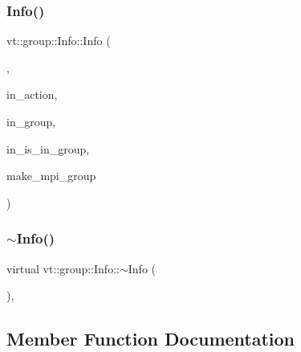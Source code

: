 \mbox{\label{structvt_1_1group_1_1_info_a87a6ef1f2feb855de0ba58d87471ecb8}} 
\subsubsection{\texorpdfstring{Info()}{Info()}\hspace{0.1cm}{\footnotesize\ttfamily [5/5]}}
{\footnotesize\ttfamily vt\+::group\+::\+Info\+::\+Info (\begin{DoxyParamCaption}\item[{Info\+Collective\+Cons\+Type}]{,  }\item[{\hyperlink{namespacevt_ae0a5a7b18cc99d7b732cb4d44f46b0f3}{Action\+Type}}]{in\+\_\+action,  }\item[{\hyperlink{namespacevt_a27b5e4411c9b6140c49100e050e2f743}{Group\+Type} const}]{in\+\_\+group,  }\item[{bool const}]{in\+\_\+is\+\_\+in\+\_\+group,  }\item[{bool}]{make\+\_\+mpi\+\_\+group }\end{DoxyParamCaption})}

\mbox{\label{structvt_1_1group_1_1_info_a04f1febedc844247ef36c17146f5ccfc}} 
\subsubsection{\texorpdfstring{$\sim$\+Info()}{~Info()}}
{\footnotesize\ttfamily virtual vt\+::group\+::\+Info\+::$\sim$\+Info (\begin{DoxyParamCaption}{ }\end{DoxyParamCaption})\hspace{0.3cm}{\ttfamily [inline]}, {\ttfamily [virtual]}}



\subsection{Member Function Documentation}
\mbox{\label{structvt_1_1group_1_1_info_a399b8266c01f53484469b3b14cdc8640}} 
